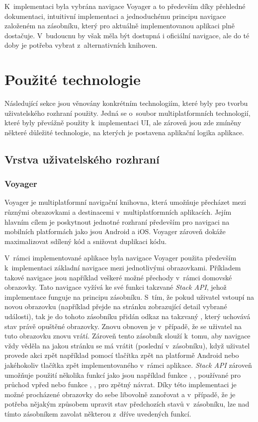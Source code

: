 \medskip

K~implementaci byla vybrána navigace Voyager a 
to především díky přehledné dokumentaci, intuitivní implementaci a jednoduchému principu navigace založeném na zásobníku, který pro aktuálně
implementovanou aplikaci plně dostačuje. V~budoucnu by však měla být dostupná i oficiální navigace, ale do té doby je potřeba vybrat z~alternativních knihoven.

\section{Použité technologie}
Následující sekce jsou věnovány konkrétním technologiím, které byly pro tvorbu uživatelského rozhraní použity.
Jedná se o~soubor multiplatformních technologií, které byly převážně použity k~implementaci UI, ale zároveň jsou zde zmíněny některé 
důležité technologie, na kterých je postavena aplikační logika aplikace.

\subsection{Vrstva uživatelského rozhraní}

\subsubsection*{Voyager}
Voyager je multiplatformní navigační knihovna, která umožňuje přecházet mezi různými obrazovkami a destinacemi v~multiplatformních
aplikacích. \cite{voyager} Jejím hlavním cílem je poskytnout jednotné rozhraní především pro navigaci na mobilních platformách jako 
jsou Android a iOS. Voyager zároveň dokáže maximalizovat sdílený kód a snižovat duplikaci kódu.

\medskip

V~rámci implementované aplikace byla navigace Voyager použita především k~implementaci základní navigace mezi jednotlivými obrazovkami.
Příkladem takové navigace jsou například veškeré možné přechody v~rámci domovské obrazovky. Tato navigace vyžívá ke své funkci takzvané 
\textit{Stack API}, jehož implementace funguje na principu zásobníku. S~tím, že pokud uživatel vstoupí na novou obrazovku 
(například přejde na stránku zobrazující detail vybrané události), tak je do tohoto zásobníku přidán odkaz na takzvaný ,
který uchovává stav právě opuštěné obrazovky. Znovu obnoven je v~případě, že se uživatel na tuto obrazovku znovu vrátí. Zároveň tento
zásobník slouží k~tomu, aby navigace vždy věděla na jakou stránku se má vrátit (poslední v~zásobníku), když uživatel provede akci zpět
například pomocí tlačítka zpět na platformě Android nebo jakéhokoliv tlačítka zpět implementovaného v~rámci aplikace. \textit{Stack API}
 zároveň umožňuje použití několika funkcí jako jsou například funkce , ,  používané pro průchod vpřed 
 nebo funkce , ,  pro zpětný návrat. 
Díky této implementaci je možné procházené obrazovky do sebe libovolně zanořovat a v~případě, že je potřeba nějakým způsobem upravit
stav předchozích stavů v~zásobníku, lze nad tímto zásobníkem zavolat některou z~dříve uvedených funkcí.

